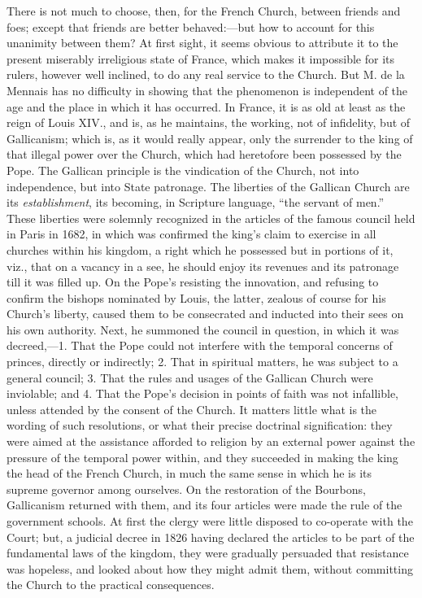 There is not much to choose, then, for the French
Church, between friends and foes; except that friends are better
behaved:—but how to account for this unanimity between them? At
first sight, it seems obvious to attribute it to the present miserably
irreligious state of France, which makes it impossible for its rulers,
however well inclined, to do any real service to the Church. But M. de
la Mennais has no difficulty in showing that the phenomenon is
independent of the age and the place in which it has occurred. In
France, it is as old at least as the reign of Louis XIV., and is, as
he maintains, the working, not of infidelity, but of Gallicanism;
which is, as it would really appear, only the surrender to the king of
that illegal power over the Church, which had heretofore been
possessed by the Pope. The Gallican principle is the vindication of
the Church, not into independence, but into State patronage. The
liberties of the Gallican Church are its \emph{establishment}, its
becoming, in Scripture language, ``the servant of men.'' These liberties
were solemnly recognized in the articles of the famous council held in
Paris in 1682, in which was confirmed the king's claim to exercise in
all churches within his kingdom, a right which he possessed but in
portions of it, viz., that on a vacancy in a see, he should enjoy its
revenues and its patronage till it was filled up. On the Pope's
resisting the innovation, and refusing to confirm the bishops
nominated by Louis, the latter, zealous of course for his Church's
liberty, caused them to be consecrated and inducted into their sees on
his own authority. Next, he summoned the council in question, in which
it was decreed,—1. That the Pope could not interfere with the temporal concerns of princes, directly or indirectly; 2. That in
spiritual matters, he was subject to a general council; 3. That the
rules and usages of the Gallican Church were inviolable; and 4. That
the Pope's decision in points of faith was not infallible, unless
attended by the consent of the Church. It matters little what is the
wording of such resolutions, or what their precise doctrinal
signification: they were aimed at the assistance afforded to religion
by an external power against the pressure of the temporal power
within, and they succeeded in making the king the head of the French
Church, in much the same sense in which he is its supreme governor
among ourselves. On the restoration of the Bourbons, Gallicanism
returned with them, and its four articles were made the rule of the
government schools. At first the clergy were little disposed to
co-operate with the Court; but, a judicial decree in 1826 having
declared the articles to be part of the fundamental laws of the
kingdom, they were gradually persuaded that resistance was hopeless,
and looked about how they might admit them, without committing the
Church to the practical consequences.

